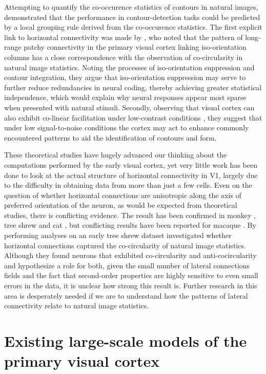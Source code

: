 Attempting to quantify the co-occurence statistics of contours in
natural images, \cite{Geisler2001} demonstrated that the performance
in contour-detection tasks could be predicted by a local grouping rule
derived from the co-occurence statistics. The first explicit link to
horizontal connectivity was made by \cite{Sigman2001}, who noted that
the pattern of long-range patchy connectivity in the primary visual
cortex linking iso-orientation columns has a close correspondence with
the observation of co-circularity in natural image statistics. Noting
the processes of iso-orientation suppression and contour integration,
they argue that iso-orientation suppression may serve to further
reduce redundancies in neural coding, thereby achieving greater
statistical independence, which would explain why neural responses
appear most sparse when presented with natural stimuli. Secondly,
observing that visual cortex can also exhibit co-linear facilitation
under low-contrast conditions \citep{Sceniak1999, Kapadia1999}, they
suggest that under low signal-to-noise conditions the cortex may act
to enhance commonly encountered patterns to aid the identification of
contours and form.

These theoretical studies have hugely advanced our thinking about the
computations performed by the early visual cortex, yet very little
work has been done to look at the actual structure of horizontal
connectivity in V1, largely due to the difficulty in obtaining data
from more than just a few cells. Even on the question of whether
horizontal connections are anisotropic along the axis of preferred
orientation of the neuron, as would be expected from theoretical
studies, there is conflicting evidence. The result has been confirmed
in monkey \citep{Sincich2001}, tree shrew \citep{Bosking1997} and cat
\citep{Schmidt1997}, but conflicting results have been reported for
macaque \citep{Angelucci2002}. By performing analyses on an early tree
shrew dataset \cite{Hunt2011} investigated whether horizontal
connections captured the co-circularity of natural image
statistics. Although they found neurons that exhibited co-circularity
and anti-cocircularity and hypothesize a role for both, given the
small number of lateral connections fields and the fact that
second-order properties are highly sensitive to even small errors in
the data, it is unclear how strong this result is. Further research in
this area is desperately needed if we are to understand how the
patterns of lateral connectivity relate to natural image statistics.

\section{Existing large-scale models of the primary visual cortex}

